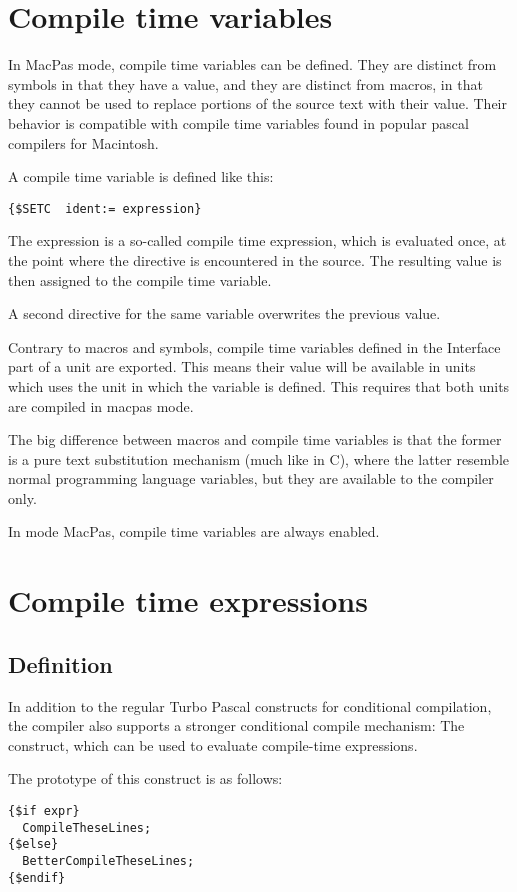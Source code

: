 \section{Compile time variables}
In MacPas mode, compile time variables can be defined. They are distinct
from symbols in that they have a value, and they are distinct from macros,
in that they cannot be used to replace portions of the source text with
their value. Their behavior is compatible with compile time variables 
found in popular pascal compilers for Macintosh. 

A compile time variable is defined like this:
\begin{verbatim}
{$SETC  ident:= expression}
\end{verbatim}
The expression is a so-called compile time expression, which is evaluated once, 
at the point where the  directive is encountered in the
source. The resulting value is then assigned to the compile time variable.

A second  directive for the same variable overwrites the previous value.

Contrary to macros and symbols, compile time variables defined in the 
Interface part of a unit are exported. This means their value will be 
available in units which uses the unit in which the variable is defined. 
This requires that both units are compiled in macpas mode.

The big difference between macros and compile time variables is that the
former is a pure text substitution mechanism (much like in C), where the
latter resemble normal programming language variables, but they are
available to the compiler only. 

In mode MacPas, compile time variables are always enabled.

\section{Compile time expressions}
\subsection{Definition}
\label{se:compileexpressions}
In addition to the regular Turbo Pascal constructs for conditional compilation,
the \fpc compiler also supports a stronger conditional compile mechanism: 
The  construct, which can be used to evaluate compile-time
expressions.


The prototype of this construct is as follows:
\begin{verbatim}
{$if expr}
  CompileTheseLines;
{$else}
  BetterCompileTheseLines;
{$endif}
\end{verbatim}

